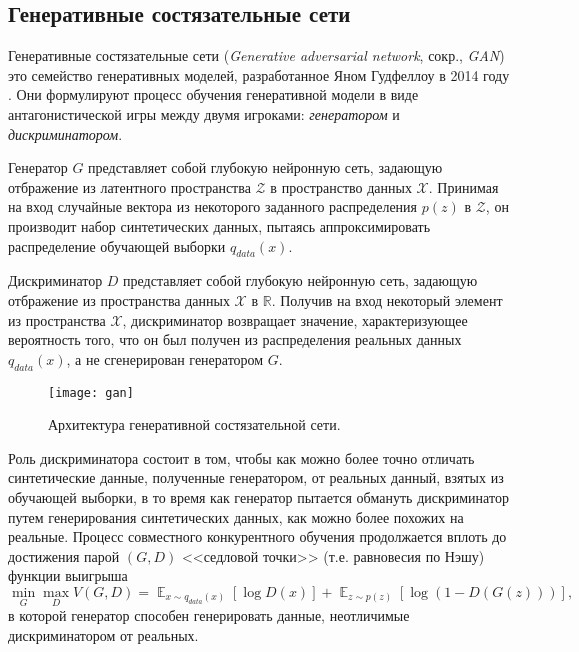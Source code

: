 
\subsection{Генеративные состязательные сети}

Генеративные состязательные сети (\emph{Generative adversarial network}, сокр., \emph{GAN})  это семейство генеративных моделей, разработанное Яном Гудфеллоу в 2014 году \cite{goodfellow2014generative}.  Они формулируют процесс обучения  генеративной модели в виде антагонистической игры между двумя игроками: \emph{генератором} и \emph{дискриминатором}.

Генератор $G$ представляет собой глубокую нейронную сеть, задающую отбражение из латентного пространства $\mathcal Z$ в пространство данных $\mathcal X$.
Принимая на вход случайные вектора из некоторого заданного распределения $p(z)$ в $\mathcal Z$, он производит набор синтетических данных, пытаясь аппроксимировать распределение обучающей выборки $q_{data}(x)$.

Дискриминатор $D$ представляет собой глубокую нейронную сеть, задающую отбражение из пространства данных $\mathcal X$ в $\mathbb R$. Получив на вход некоторый элемент из пространства $\mathcal X$, дискриминатор возвращает значение, характеризующее вероятность того, что он был получен из распределения реальных данных $q_{data}(x)$, а не сгенерирован генератором $G$.

\begin{figure}[h]
\begin{center}
    \texttt{[image: gan]}
    \caption{Архитектура генеративной состязательной сети.}
    \label{fig:subim11}
\end{center}
\end{figure}

Роль дискриминатора состоит в том, чтобы как можно более точно отличать синтетические данные, полученные генератором, от реальных данный, взятых из обучающей выборки, в то время как генератор пытается обмануть дискриминатор путем генерирования синтетических данных, как можно более похожих на реальные.
Процесс совместного конкурентного обучения продолжается вплоть до достижения парой $(G, D)$ <<седловой точки>> (т.е. равновесия по Нэшу) \cite{goodfellow2017nips} функции выигрыша
$$
\min_{G} \max_{D} V(G, D) = \mathop{\mathbb{E}}_{x \sim q_{data}(x)} [\log D(x)] + \mathop{\mathbb{E}}_{z \sim p(z)} [\log (1 - D(G(z)))] ,
$$
в которой генератор способен генерировать данные, неотличимые дискриминатором от реальных.

